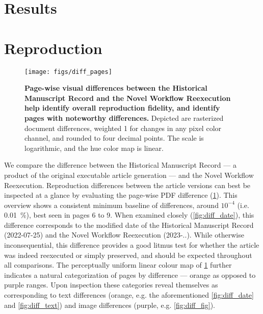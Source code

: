 \section{Results}

\section{Reproduction}

\begin{figure}
	\centering
	\texttt{[image: figs/diff\_pages]}
	\caption{
		\textbf{Page-wise visual differences between the Historical Manuscript Record and the Novel Workflow Reexecution help identify overall reproduction fidelity, and identify pages with noteworthy differences.}
		Depicted are rasterized document differences, weighted 1 for changes in any pixel color channel, and rounded to four decimal points.
		The scale is logarithmic, and the hue color map is linear.
	}
	\label{fig:diff_pages}
\end{figure}

We compare the difference between the Historical Manuscript Record — a product of the original executable article generation — and the Novel Workflow Reexecution.
Reproduction differences between the article versions can best be inspected at a glance by evaluating the page-wise PDF difference (\ref{fig:diff_pages}).
This overview shows a consistent minimum baseline of differences, around $10^{-4}$ (i.e. \SI{0.01}{\percent}), best seen in pages 6 to 9.
When examined closely (\ref{fig:diff_date}), this difference corresponds to the modified date of the Historical Manuscript Record (2022-07-25) and the Novel Workflow Reexecution (2023-..).
While otherwise inconsequential, this difference provides a good litmus test for whether the article was indeed reexecuted or simply preserved, and should be expected throughout all comparisons.
The perceptually uniform linear colour map of \cref{fig:diff_pages} further indicates a natural categorization of pages by difference — orange as opposed to purple ranges.
Upon inspection these categories reveal themselves as corresponding to text differences (orange, e.g. the aforementioned \cref{fig:diff_date} and \cref{fig:diff_text}) and image differences (purple, e.g. \cref{fig:diff_fig}).

